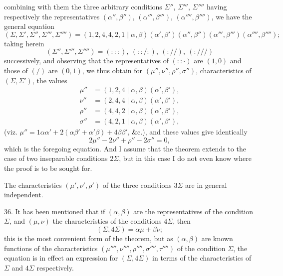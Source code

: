 \documentclass[12pt,a4paper]{article}
\begin{document}
combining with them the three arbitrary conditions $\Sigma''$, $\Sigma'''$, $\Sigma''''$ having respectively the representatives $(\alpha'', \beta'')$, $(\alpha''', \beta''')$, $(\alpha'''', \beta'''')$, we have the general equation
\[
(\Sigma, \Sigma', \Sigma'', \Sigma''', \Sigma'''') = (1, 2, 4, 4, 2, 1 \mid \alpha, \beta)(\alpha', \beta')(\alpha'', \beta'')(\alpha''', \beta''')(\alpha'''', \beta'''');
\]
taking herein
\[
(\Sigma'', \Sigma''', \Sigma'''') = (:::),\ (::/:),\ (://),\ (:///)
\]
successively, and observing that the representatives of $(::\cdot)$ are $(1, 0)$ and those of $(/)$ are $(0, 1)$, we thus obtain for $(\mu'', \nu'', \rho'', \sigma'')$, characteristics of $(\Sigma, \Sigma')$, the values
\begin{align*}
\mu'' &= (1, 2, 4 \mid \alpha, \beta)(\alpha', \beta'),\\
\nu'' &= (2, 4, 4 \mid \alpha, \beta)(\alpha', \beta'),\\
\rho'' &= (4, 4, 2 \mid \alpha, \beta)(\alpha', \beta'),\\
\sigma'' &= (4, 2, 1 \mid \alpha, \beta)(\alpha', \beta'),
\end{align*}
(viz. $\mu'' = 1\alpha\alpha' + 2(\alpha\beta' + \alpha'\beta) + 4\beta\beta'$, \&c.), and these values give identically
\[
2\mu'' - 2\nu'' + \rho'' - 2\sigma'' = 0,
\]
which is the foregoing equation. And I assume that the theorem extends to the case of two inseparable conditions $2\Sigma$, but in this case I do not even know where the proof is to be sought for.

The characteristics $(\mu', \nu', \rho')$ of the three conditions $3\Sigma$ are in general independent.

36. It has been mentioned that if $(\alpha, \beta)$ are the representatives of the condition $\Sigma$, and $(\mu, \nu)$ the characteristics of the conditions $4\Sigma$, then
\[
(\Sigma, 4\Sigma) = \alpha\mu + \beta\nu;
\]
this is the most convenient form of the theorem, but as $(\alpha, \beta)$ are known functions of the characteristics $(\mu'''', \nu'''', \rho'''', \sigma'''', \tau'''')$ of the condition $\Sigma$, the equation is in effect an expression for $(\Sigma, 4\Sigma)$ in terms of the characteristics of $\Sigma$ and $4\Sigma$ respectively.
\end{document}
